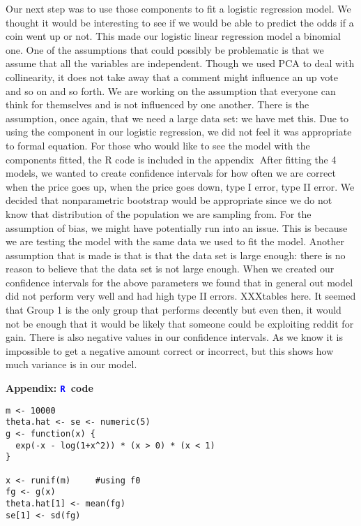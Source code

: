 \documentclass[12pt]{article}
\newcommand{\textR}[1]{\textcolor{blue}{\texttt{#1}}}
\newcommand{\R}{\textR{R}}
\begin{document}
\indent Our next step was to use those components to fit a logistic regression model. We thought it would be interesting to see if we would be able to predict the odds if a coin went up or not. This made our logistic linear regression model a binomial one. One of the assumptions that could possibly be problematic is that we assume that all the variables are independent. Though we used PCA to deal with collinearity, it does not take away that a comment might influence an up vote and so on and so forth. We are working on the assumption that everyone can think for themselves and is not influenced by one another. There is the assumption, once again, that we need a large data set: we have met this. Due to using the component in our logistic regression, we did not feel it was appropriate to formal equation. For those who would like to see the model with the components fitted, the R code is included in the appendix
\indent After fitting the 4 models, we wanted to create confidence intervals for how often we are correct when the price goes up, when the price goes down, type I error, type II error. We decided that nonparametric bootstrap would be appropriate since we do not know that distribution of the population we are sampling from. For the assumption of bias, we might have potentially run into an issue. This is because we are testing the model with the same data we used to fit the model. Another assumption that is made is that is that the data set is large enough: there is no reason to believe that the data set is not large enough. When we created our confidence intervals for the above parameters we found that in general out model did not perform very well and had high type II errors. XXXtables here. It seemed that Group 1 is the only group that performs decently but even then, it would not be enough that it would be likely that someone could be exploiting reddit for gain. There is also negative values in our confidence intervals. As we know it is impossible to get a negative amount correct or incorrect, but this shows how much variance is in our model.

\newpage






\newpage

\appendix
\begin{center}
{\Large {\bf Appendix: \R\ code}}
\end{center}

{\footnotesize \begin{verbatim}
m <- 10000 
theta.hat <- se <- numeric(5)
g <- function(x) {
  exp(-x - log(1+x^2)) * (x > 0) * (x < 1)
}

x <- runif(m)     #using f0
fg <- g(x)
theta.hat[1] <- mean(fg)
se[1] <- sd(fg)
\end{verbatim} }
\end{document}
